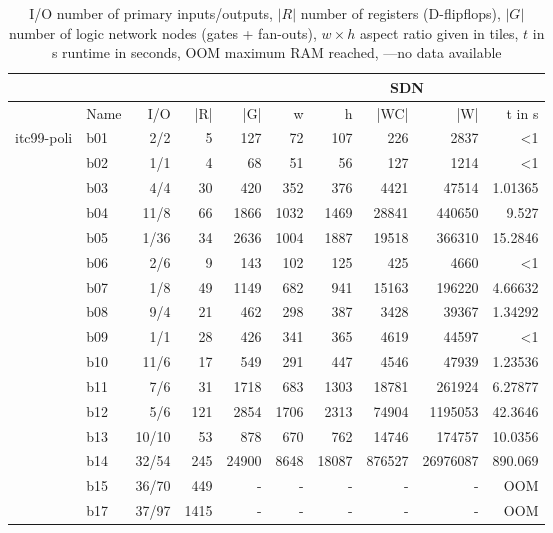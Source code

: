 \begin{sidewaystable}[htbp]
	\centering
	\begin{tabular}{|r|l|r|r|r|r|r|r|r|r|}
		\toprule
		\multicolumn{1}{|r}{} & \multicolumn{1}{r}{} & \multicolumn{1}{r}{} &       & \multicolumn{1}{r}{} & \multicolumn{5}{c|}{SDN} \\
		\midrule
		& \multicolumn{1}{r|}{Name} & I/O   & |R|   & |G|   & w     &  h    & |WC|  & |W|   & t in s \\
		\midrule
		\multicolumn{1}{|l|}{itc99-poli \cite{itc_poli}} & b01   & 2/2   & 5     & 127   & 72    & 107   & 226   & 2837  & <1 \\
		& b02   & 1/1   & 4     & 68    & 51    & 56    & 127   & 1214  & <1 \\
		& b03   & 4/4   & 30    & 420   & 352   & 376   & 4421  & 47514 & 1.01365 \\
		& b04   & 11/8  & 66    & 1866  & 1032  & 1469  & 28841 & 440650 & 9.527 \\
		& b05   & 1/36  & 34    & 2636  & 1004  & 1887  & 19518 & 366310 & 15.2846 \\
		& b06   & 2/6   & 9     & 143   & 102   & 125   & 425   & 4660  & <1 \\
		& b07   & 1/8   & 49    & 1149  & 682   & 941   & 15163 & 196220 & 4.66632 \\
		& b08   & 9/4   & 21    & 462   & 298   & 387   & 3428  & 39367 & 1.34292 \\
		& b09   & 1/1   & 28    & 426   & 341   & 365   & 4619  & 44597 & <1 \\
		& b10   & 11/6  & 17    & 549   & 291   & 447   & 4546  & 47939 & 1.23536 \\
		& b11   & 7/6   & 31    & 1718  & 683   & 1303  & 18781 & 261924 & 6.27877 \\
		& b12   & 5/6   & 121   & 2854  & 1706  & 2313  & 74904 & 1195053 & 42.3646 \\
		& b13   & 10/10 & 53    & 878   & 670   & 762   & 14746 & 174757 & 10.0356 \\
		& b14   & 32/54 & 245   & 24900 & 8648  & 18087 & 876527 & 26976087 & 890.069 \\
		& b15   & 36/70 & 449   & -     & -     & -     & -     & -     & OOM \\
		& b17   & 37/97 & 1415  & -     & -     & -     & -     & -     & OOM \\
		\bottomrule
	\end{tabular}%
		\caption{I/O number of primary inputs/outputs, $|R|$ number of registers (D-flipflops), $|G|$ number of logic network nodes (gates + fan-outs), $w \times h$ aspect ratio given in tiles, $t$ in s runtime in seconds, OOM maximum RAM reached, ---no data available}\label{tab:seq_exp}%
\end{sidewaystable}%




